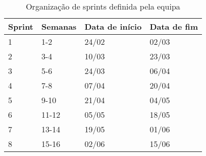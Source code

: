 \begin{table}[h!tbp]
    \centering
    \caption{Organização de sprints definida pela equipa}
    \begin{tabular}{llll}
        Sprint & Semanas & Data de início & Data de fim \\\midrule
        1      & 1-2     & 24/02          & 02/03       \\\midrule
        2      & 3-4     & 10/03          & 23/03       \\\midrule
        3      & 5-6     & 24/03          & 06/04       \\\midrule
        4      & 7-8     & 07/04          & 20/04       \\\midrule
        5      & 9-10    & 21/04          & 04/05       \\\midrule
        6      & 11-12   & 05/05          & 18/05       \\\midrule
        7      & 13-14   & 19/05          & 01/06       \\\midrule
        8      & 15-16   & 02/06          & 15/06       \\\bottomrule
    \end{tabular}
    
    \label{tab:organizacao_sprints}
\end{table}
